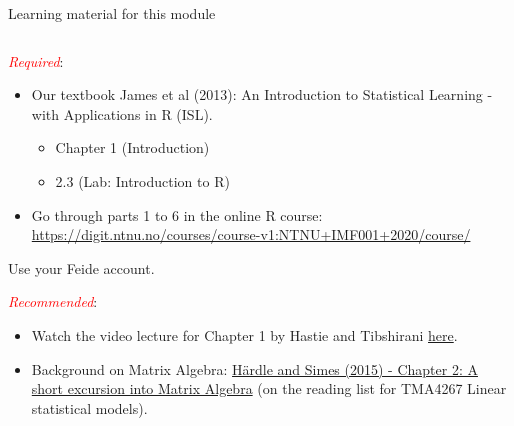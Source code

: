 \documentclass[10pt,ignorenonframetext,]{beamer}
\providecommand{\tightlist}{%
  \setlength{\itemsep}{0pt}\setlength{\parskip}{0pt}}
\begin{document}
\begin{frame}

\begin{block}{Learning material for this module}

\(~\)

\emph{\textcolor{red}{Required}}:

\vspace{1mm}

\begin{itemize}
\tightlist
\item
  Our textbook James et al (2013): An Introduction to Statistical
  Learning - with Applications in R (ISL).

  \begin{itemize}
  \tightlist
  \item
    Chapter 1 (Introduction)
  \item
    2.3 (Lab: Introduction to R)
  \end{itemize}
\end{itemize}

\vspace{2mm}

\begin{itemize}
\tightlist
\item
  Go through parts 1 to 6 in the online R course:
  \url{https://digit.ntnu.no/courses/course-v1:NTNU+IMF001+2020/course/}
\end{itemize}

Use your Feide account.

\vspace{3mm}

\emph{\textcolor{red}{Recommended}}:

\vspace{1mm}

\begin{itemize}
\item
  Watch the video lecture for Chapter 1 by Hastie and Tibshirani
  \href{https://www.r-bloggers.com/in-depth-introduction-to-machine-learning-in-15-hours-of-expert-videos/}{here}.
\item
  Background on Matrix Algebra:
  \href{https://link.springer.com/chapter/10.1007/978-3-662-45171-7_2}{Härdle
  and Simes (2015) - Chapter 2: A short excursion into Matrix Algebra}
  (on the reading list for TMA4267 Linear statistical models).
\end{itemize}

\end{block}

\end{frame}
\end{document}
